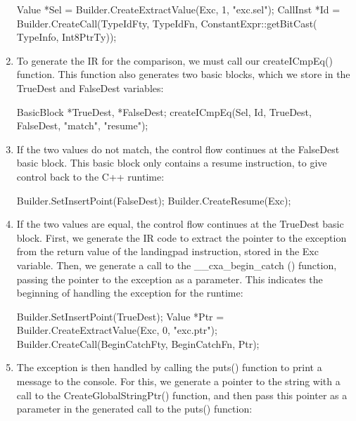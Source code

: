 \begin{enumerate}
\begin{cpp}
    Value *Sel =
        Builder.CreateExtractValue(Exc, {1}, "exc.sel");
    CallInst *Id =
        Builder.CreateCall(TypeIdFty, TypeIdFn,
                            {ConstantExpr::getBitCast(
                                TypeInfo, Int8PtrTy)});
\end{cpp}

\item
To generate the IR for the comparison, we must call our createICmpEq() function. This function also generates two basic blocks, which we store in the TrueDest and FalseDest variables:

\begin{cpp}
    BasicBlock *TrueDest, *FalseDest;
    createICmpEq(Sel, Id, TrueDest, FalseDest, "match",
                "resume");
\end{cpp}

\item
If the two values do not match, the control flow continues at the FalseDest basic block.
This basic block only contains a resume instruction, to give control back to the C++ runtime:

\begin{cpp}
    Builder.SetInsertPoint(FalseDest);
    Builder.CreateResume(Exc);
\end{cpp}

\item
If the two values are equal, the control flow continues at the TrueDest basic block. First, we generate the IR code to extract the pointer to the exception from the return value of the landingpad instruction, stored in the Exc variable. Then, we generate a call to the \_\_cxa\_begin\_catch () function, passing the pointer to the exception as a parameter. This indicates the beginning of handling the exception for the runtime:

\begin{cpp}
    Builder.SetInsertPoint(TrueDest);
    Value *Ptr =
        Builder.CreateExtractValue(Exc, {0}, "exc.ptr");
    Builder.CreateCall(BeginCatchFty, BeginCatchFn,
                        {Ptr});
\end{cpp}

\item
The exception is then handled by calling the puts() function to print a message to the console. For this, we generate a pointer to the string with a call to the CreateGlobalStringPtr() function, and then pass this pointer as a parameter in the generated call to the puts() function:


\end{enumerate}
